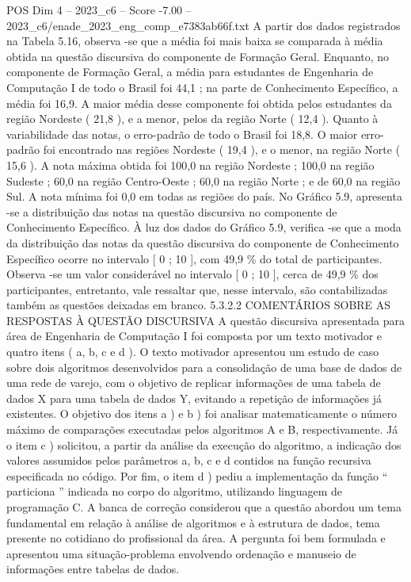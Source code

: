 \begin{textsample}{POS Dim 4 – 2023\_c6 – Score -7.00 – 2023\_c6/enade\_2023\_eng\_comp\_e7383ab66f.txt}
A partir dos dados registrados na Tabela 5.16, observa -se que a média foi mais baixa se comparada à média obtida na questão discursiva do componente de Formação Geral.
Enquanto, no componente de Formação Geral, a média para estudantes de Engenharia de Computação I de todo o Brasil foi 44,1 ; na parte de Conhecimento Específico, a média foi 16,9.
A maior média desse componente foi obtida pelos estudantes da região Nordeste ( 21,8 ), e a menor, pelos da região Norte ( 12,4 ).
Quanto à variabilidade das notas, o erro-padrão de todo o Brasil foi 18,8.
O maior erro-padrão foi encontrado nas regiões Nordeste ( 19,4 ), e o menor, na região Norte ( 15,6 ).
A nota máxima obtida foi 100,0 na região Nordeste ; 100,0 na região Sudeste ; 60,0 na região Centro-Oeste ; 60,0 na região Norte ; e de 60,0 na região Sul.
A nota mínima foi 0,0 em todas as regiões do país.
No Gráfico 5.9, apresenta -se a distribuição das notas na questão discursiva no componente de Conhecimento Específico.
À luz dos dados do Gráfico 5.9, verifica -se que a moda da distribuição das notas da questão discursiva do componente de Conhecimento Específico ocorre no intervalo [ 0 ; 10 ], com 49,9 \% do total de participantes.
Observa -se um valor considerável no intervalo [ 0 ; 10 ], cerca de 49,9 \% dos participantes, entretanto, vale ressaltar que, nesse intervalo, são contabilizadas também as questões deixadas em branco. 5.3.2.2 COMENTÁRIOS SOBRE AS RESPOSTAS À QUESTÃO DISCURSIVA A questão discursiva apresentada para área de Engenharia de Computação I foi composta por um texto motivador e quatro itens ( a, b, c e d ).
O texto motivador apresentou um estudo de caso sobre dois algoritmos desenvolvidos para a consolidação de uma base de dados de uma rede de varejo, com o objetivo de replicar informações de uma tabela de dados X para uma tabela de dados Y, evitando a repetição de informações já existentes.
O objetivo dos itens a ) e b ) foi analisar matematicamente o número máximo de comparações executadas pelos algoritmos A e B, respectivamente.
Já o item c ) solicitou, a partir da análise da execução do algoritmo, a indicação dos valores assumidos pelos parâmetros a, b, c e d contidos na função recursiva especificada no código.
Por fim, o item d ) pediu a implementação da função “ particiona ” indicada no corpo do algoritmo, utilizando linguagem de programação C.
A banca de correção considerou que a questão abordou um tema fundamental em relação à análise de algoritmos e à estrutura de dados, tema presente no cotidiano do profissional da área.
A pergunta foi bem formulada e apresentou uma situação-problema envolvendo ordenação e manuseio de informações entre tabelas de dados.

\end{textsample}
